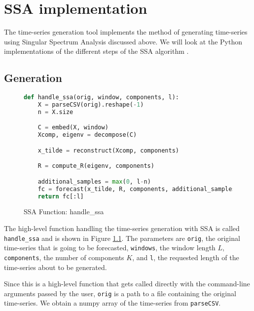 
\chapter{SSA implementation}\label{chapter:ssa-impl}

The time-series generation tool implements the method of generating time-series using Singular Spectrum Analysis discussed above. We will look at the Python implementations of the different steps of the SSA algorithm \parencite{tsgenerator}.

\section{Generation}

\begin{figure}
\begin{singlespace}
\begin{lstlisting}[language=Python]
def handle_ssa(orig, window, components, l):
    X = parseCSV(orig).reshape(-1)
    n = X.size

    C = embed(X, window)
    Xcomp, eigenv = decompose(C)

    x_tilde = reconstruct(Xcomp, components)

    R = compute_R(eigenv, components)

    additional_samples = max(0, l-n)
    fc = forecast(x_tilde, R, components, additional_samples)
    return fc[:l]
\end{lstlisting}
\end{singlespace}
\caption{SSA Function: handle\_ssa}    
\label{fig:ssa-handle}
\end{figure}

The high-level function handling the time-series generation with SSA is called \texttt{handle\_ssa} and is shown in Figure \ref{fig:ssa-handle}. The parameters are \texttt{orig}, the original time-series that is going to be forecasted, \texttt{windows}, the window length $L$, \texttt{components}, the number of components $K$, and \texttt{l}, the requested length of the time-series about to be generated. 

Since this is a high-level function that gets called directly with the command-line arguments passed by the user, \texttt{orig} is a path to a file containing the original time-series. We obtain a numpy array of the time-series from \texttt{parseCSV}.

